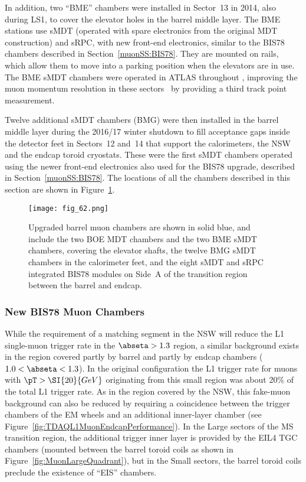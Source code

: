 \documentclass[cernpreprint, atlasdraft=false, UKenglish,british,orcidlogo, texmf, orcidlogo]{atlasdoc}
\begin{document}
In addition, two ``BME'' chambers were installed in Sector~13 in 2014, also during \gls{LS1}, to cover the elevator holes in the barrel middle layer.
The BME stations use \gls{sMDT} (operated with spare electronics from the original \gls{MDT} construction) and \gls{sRPC}, with new \analog front-end electronics, similar to the \gls{BIS78} chambers described in Section~\ref{muonSS:BIS78}. They are mounted on rails, which allow them to move into a parking position when the elevators are in use.
The BME \gls{sMDT} chambers were operated in ATLAS throughout \RunTwo, improving the muon momentum resolution in these sectors~\cite{BMEBMG1,BMEBMG2} by providing a third track point measurement.
 
Twelve additional \gls{sMDT} chambers (BMG) were then installed in the barrel middle layer during the 2016/17 winter shutdown to fill acceptance gaps inside the detector feet in Sectors~12 and~14 that support the calorimeters, the \gls{NSW} and the endcap toroid cryostats. These were the first \gls{sMDT} chambers operated using the newer front-end electronics also used for the \gls{BIS78} upgrade, described in Section~\ref{muonSS:BIS78}.
The locations of all the chambers described in this section are shown in Figure~\ref{fig:muon_barrel_phase1}.
\begin{figure}[!h]
\centering
\texttt{[image: fig\_62.png]}
\caption{Upgraded barrel muon chambers are shown in solid blue, and include the two BOE \gls{MDT} chambers and the two BME \gls{sMDT} chambers, covering the elevator shafts, the twelve BMG \gls{sMDT} chambers in the calorimeter feet, and the eight \gls{sMDT} and \gls{sRPC} integrated \gls{BIS78} modules on Side~A of the transition region between the barrel and endcap.}
\label{fig:muon_barrel_phase1}
\end{figure}
 
 
\subsubsection{New BIS78 Muon Chambers \label{muonSS:BIS78}}
While the requirement of a matching segment in the \gls{NSW} will reduce the \gls{L1} single-muon trigger rate in the $\abseta > 1.3$ region, a similar background exists in the region covered partly by barrel and partly by endcap chambers ($1.0<\abseta <1.3$).
In the original \RunOne configuration
the \gls{L1} trigger rate for muons with $\pT > \SI{20}{GeV}$ originating from this small region was about
20\% of the total \gls{L1} trigger rate. 
As in the region covered by the \gls{NSW}, this fake-muon background can also be reduced by requiring a coincidence between the trigger chambers of the EM wheels and an additional inner-layer chamber (see Figure~\ref{fig:TDAQL1MuonEndcapPerformance}).
In the Large sectors of the \gls{MS} transition region, the additional trigger inner layer is provided by the \gls{EIL4} \gls{TGC} chambers (mounted between the barrel toroid coils as shown in Figure~\ref{fig:MuonLargeQuadrant}), but in the Small sectors, the barrel toroid coils preclude the existence of ``EIS'' chambers.
 
\end{document}
